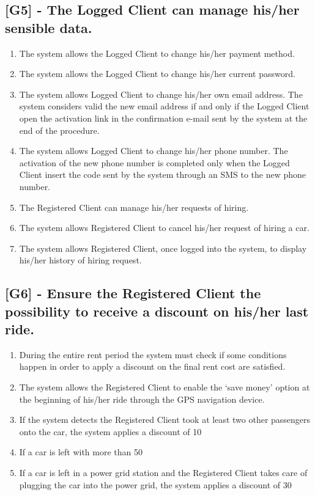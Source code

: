 \subsection{[G5] - The Logged Client can manage his/her sensible data.}
\begin{enumerate}[label=R5.\arabic*]
\item The system allows the Logged Client to change his/her payment method.
\item The system allows the Logged Client to change his/her current password.
\item The system allows Logged Client to change his/her own email address. The system considers valid the new email address if and only if the Logged Client open the activation link in the confirmation e-mail sent by the system at the end of the procedure.
\item The system allows Logged Client to change his/her phone number. The activation of the new phone number is completed only when the Logged Client insert the code sent by the system through an SMS to the new phone number.
\item The Registered Client can manage his/her requests of hiring.
\item The system allows Registered Client to cancel his/her request of hiring a car.
\item The system allows Registered Client, once logged into the system, to display his/her history of hiring request.
\end{enumerate}

\subsection{[G6] - Ensure the Registered Client the possibility to receive a discount on his/her last ride.}
\begin{enumerate}[label=R6.\arabic*]
\item During the entire rent period the system must check if some conditions happen in order to apply a discount on the final rent cost are satisfied.
\item The system allows the Registered Client to enable the ‘save money’ option at the beginning of his/her ride through the GPS navigation device.
\item If the system detects the Registered Client took at least two other passengers onto the car, the system applies a discount of 10%
\item If a car is left with more than 50%
\item If a car is left in a power grid station and the Registered Client takes care of plugging the car into the power grid, the system applies a discount of 30%

\end{enumerate}

